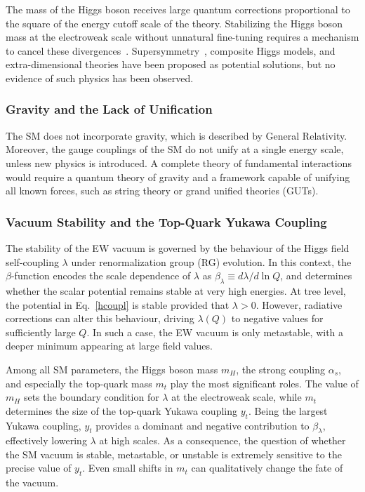 The mass of the Higgs boson receives large quantum corrections proportional to the square of the energy cutoff scale of the theory. Stabilizing the Higgs boson mass at the electroweak scale without unnatural fine-tuning requires a mechanism to cancel these divergences~\cite{Weinberg:1975gm,Gildener:1976ai,Weinberg:1979bn,Susskind:1978ms}. Supersymmetry~\cite{Dimopoulos:1981zb,Witten:1981nf,Dine:1981za,Dimopoulos:1981au,Sakai:1981gr,Kaul:1981hi}, composite Higgs models, and extra-dimensional theories have been proposed as potential solutions, but no evidence of such physics has been observed.

\subsubsection*{Gravity and the Lack of Unification}

The SM does not incorporate gravity, which is described by General Relativity. Moreover, the gauge couplings of the SM do not unify at a single energy scale, unless new physics is introduced. A complete theory of fundamental interactions would require a quantum theory of gravity and a framework capable of unifying all known forces, such as string theory or grand unified theories (GUTs).

\subsubsection*{Vacuum Stability and the Top-Quark Yukawa Coupling}

The stability of the EW vacuum is governed by the behaviour of the Higgs field self-coupling $\lambda$ under renormalization group (RG) evolution. In this context, the $\beta$-function encodes the scale dependence of $\lambda$ as
$\beta_\lambda \equiv d\lambda/ d \ln Q$, and determines whether the scalar potential remains stable at very high energies. At tree level, the potential in Eq.~\ref{hcoupl} is stable provided that $\lambda>0$. However, radiative corrections can alter this behaviour, driving $\lambda(Q)$ to negative values for sufficiently large $Q$. In such a case, the EW vacuum is only metastable, with a deeper minimum appearing at large field values.

Among all SM parameters, the Higgs boson mass $m_H$, the strong coupling $\alpha_s$, and especially the top-quark mass $m_t$ play the most significant roles. The value of $m_H$ sets the boundary condition for $\lambda$ at the electroweak scale, while $m_t$ determines the size of the top-quark Yukawa coupling $y_t$. Being the largest Yukawa coupling, $y_t$ provides a dominant and negative contribution to $\beta_\lambda$, effectively lowering $\lambda$ at high scales. As a consequence, the question of whether the SM vacuum is stable, metastable, or unstable is extremely sensitive to the precise value of $y_t$. Even small shifts in $m_t$ can qualitatively change the fate of the vacuum.

